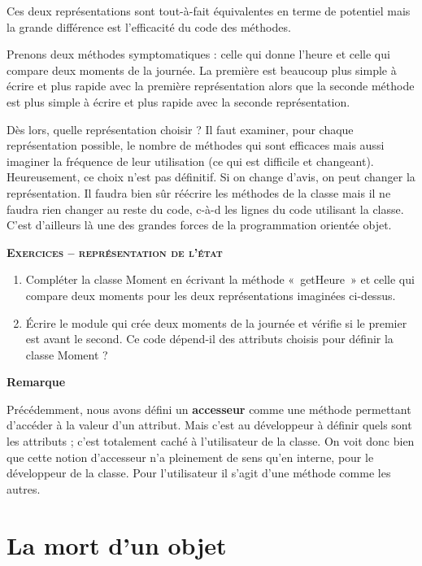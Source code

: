 Ces deux représentations sont tout-à-fait équivalentes en terme de
potentiel mais la grande différence est l'efficacité
du code des méthodes. 

Prenons deux méthodes symptomatiques : celle qui donne
l'heure et celle qui compare deux moments de la
journée. La première est beaucoup plus simple à écrire et plus rapide
avec la première représentation alors que la seconde méthode est plus
simple à écrire et plus rapide avec la seconde représentation.

Dès lors, quelle représentation choisir ? Il faut examiner, pour chaque
représentation possible, le nombre de méthodes qui sont efficaces mais
aussi imaginer la fréquence de leur utilisation (ce qui est difficile
et changeant). Heureusement, ce choix n'est pas
définitif. Si on change d'avis, on peut changer la
représentation. Il faudra bien sûr réécrire les méthodes de la classe
mais il ne faudra rien changer au reste du code, c-à-d les lignes du
code utilisant la classe. C’est d’ailleurs là une des grandes forces de
la programmation orientée objet.

{\sffamily\bfseries\scshape
Exercices – représentation de l'état}

\liststyleWWviiiNumi
\begin{enumerate}
	\item 
		Compléter la classe Moment en écrivant la méthode «~getHeure~» et celle
		qui compare deux moments pour les deux représentations imaginées
		ci-dessus.
	\item 
		Écrire le module qui crée deux moments de la journée et vérifie si le
		premier est avant le second. Ce code dépend-il des attributs choisis
		pour définir la classe Moment ?
\end{enumerate}

\bigskip

{\bfseries
Remarque}

Précédemment, nous avons défini un \textbf{accesseur} comme une méthode
permettant d’accéder à la valeur d’un attribut. Mais c’est au
développeur à définir quels sont les attributs ; c’est totalement caché
à l’utilisateur de la classe. On voit donc bien que cette notion
d’accesseur n’a pleinement de sens qu’en interne, pour le développeur
de la classe. Pour l’utilisateur il s’agit d’une méthode comme les
autres.


\section{La mort d'un objet}

